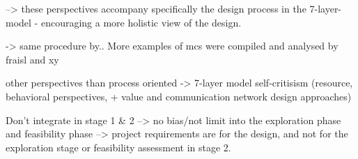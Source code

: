--> these perspectives accompany specifically the design process in the 7-layer-model - encouraging a more holistic view of the design.

-> same procedure by.. 
More examples of \acrshort*{mcs} were compiled and analysed by fraisl and xy


other perspectives than process oriented -> 7-layer model self-critisism (resource, behavioral perspectives, + value and communication network design approaches)

Don't integrate in stage 1 \& 2 --> no bias/not limit into the exploration phase and feasibility phase --> project requirements are for the design, and not for the exploration stage or feasibility assessment in stage 2.



